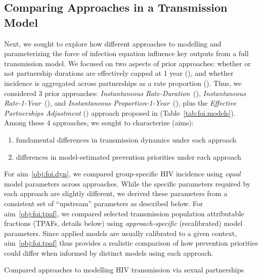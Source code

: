 \subsection{Comparing Approaches in a Transmission Model}\label{foi.exp.model}
Next, we sought to explore how different approaches to
modelling and parameterizing the force of infection equation
influence key outputs from a full transmission model.
We focused on two aspects of prior approaches:
whether or not partnership durations are effectively capped at 1 year (), and
whether incidence is aggregated across partnerships as a rate \vs proportion ().
Thus, we considered 3 prior approaches:
\emph{Instantaneous Rate-Duration}~(\ird),
\emph{Instantaneous Rate-1-Year}~(\iry), and
\emph{Instantaneous Proportion-1-Year}~(\ipy),
plus the \emph{Effective Partnerships Adjustment} (\epa) approach
proposed in 
(Table~\ref{tab:foi.models}).
Among these 4 approaches, we sought to characterize (aims):
\begin{enumerate}
  \item \label{obj:foi.dyn}
  fundamental differences in transmission dynamics under each approach
  \item \label{obj:foi.tpaf}
  differences in model-estimated prevention priorities under each approach
  \end{enumerate}
For aim~\ref{obj:foi.dyn}, we compared group-specific HIV incidence
using \emph{equal} model parameters across approaches.
While the specific parameters required by each approach are slightly different,
we derived these parameters from a consistent set of ``upstream'' parameters as described below.
For aim~\ref{obj:foi.tpaf}, we compared selected
transmission population attributable fractions (TPAFs, details below)
using \emph{approach-specific} (\ie recalibrated) model parameters.
Since applied models are usually calibrated to a given context,
aim~\ref{obj:foi.tpaf} thus provides a realistic comparison of
how prevention priorities could differ when informed by distinct models using each approach.
\begin{table}
  \centering
  \caption{Compared approaches to modelling HIV transmission via sexual partnerships}
  \label{tab:foi.models}
  
\end{table}
